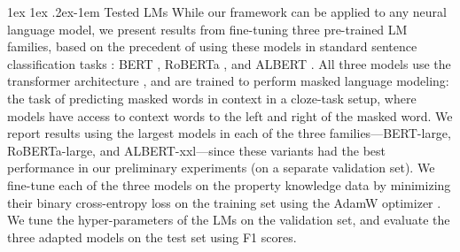 \documentclass[10pt,letterpaper]{article}
\makeatletter
\newcommand{\concepts}{\mathcal{C}}
\renewcommand{\paragraph}{%
  \@startsection{paragraph}{4}%
  {\z@}{1ex \@plus 1ex \@minus .2ex}{-1em}%
  {\normalfont\normalsize\bfseries}%
}
\makeatother
\begin{document}

\paragraph{Tested LMs}
While our framework can be applied to any neural language model, we present results from fine-tuning three pre-trained LM families, based on the precedent of using these models in standard sentence classification tasks \citep{wang2018glue}: BERT \citep{devlin-etal-2019-bert}, RoBERTa \citep{liu2019roberta}, and ALBERT \citep{lan2019albert}. 
All three models use the transformer architecture \citep{vaswani2017attention}, and are trained to perform masked language modeling: the task of predicting masked words in context in a cloze-task setup, where models have access to context words to the left and right of the masked word. 
We report results using the largest models in each of the three families---BERT-large, RoBERTa-large, and ALBERT-xxl---since these variants had the best performance in our preliminary experiments (on a separate validation set).
We fine-tune each of the three models on the property knowledge data by minimizing their binary cross-entropy loss on the training set using the AdamW optimizer \citep{loshchilov2018decoupled}.
We tune the hyper-parameters of the LMs on the validation set, and evaluate the three adapted models on the test set using F1 scores.
\end{document}
